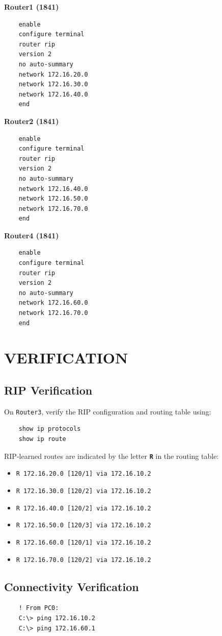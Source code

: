 \documentclass[12pt,a4paper]{article}
\begin{document}
\textbf{Router1 (1841)}
\begin{lstlisting}
	enable
	configure terminal
	router rip
	version 2
	no auto-summary
	network 172.16.20.0
	network 172.16.30.0
	network 172.16.40.0
	end
\end{lstlisting}

\textbf{Router2 (1841)}
\begin{lstlisting}
	enable
	configure terminal
	router rip
	version 2
	no auto-summary
	network 172.16.40.0
	network 172.16.50.0
	network 172.16.70.0
	end
\end{lstlisting}

\textbf{Router4 (1841)}
\begin{lstlisting}
	enable
	configure terminal
	router rip
	version 2
	no auto-summary
	network 172.16.60.0
	network 172.16.70.0
	end
\end{lstlisting}

\section*{VERIFICATION}
\subsection*{RIP Verification}
On \texttt{Router3}, verify the RIP configuration and routing table using:
\begin{lstlisting}
	show ip protocols
	show ip route
\end{lstlisting}
RIP-learned routes are indicated by the letter \textbf{\texttt{R}} in the routing table:
\begin{itemize}
	\item \texttt{R 172.16.20.0 [120/1] via 172.16.10.2}
	\item \texttt{R 172.16.30.0 [120/2] via 172.16.10.2}
	\item \texttt{R 172.16.40.0 [120/2] via 172.16.10.2}
	\item \texttt{R 172.16.50.0 [120/3] via 172.16.10.2}
	\item \texttt{R 172.16.60.0 [120/1] via 172.16.10.2}
	\item \texttt{R 172.16.70.0 [120/2] via 172.16.10.2}
\end{itemize}

\subsection*{Connectivity Verification}
\begin{lstlisting}
	! From PC0:
	C:\> ping 172.16.10.2
	C:\> ping 172.16.60.1
\end{lstlisting}
\end{document}
